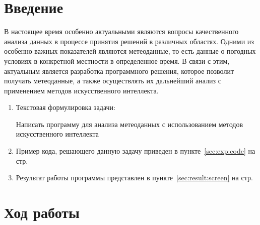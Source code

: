 \documentclass[12pt,a4paper]{scrartcl}
\begin{document}
	\section{Введение}
	\label{sec:intro}
	
	В настоящее время особенно актуальными являются вопросы качественного анализа данных в процессе принятия решений в различных областях. Одними из особенно важных показателей являются метеоданные, то есть данные о погодных условиях в конкретной местности в определенное время. В связи с этим, актуальным является разработка программного решения, которое позволит получать метеоданные, а также осуществлять их дальнейший анализ с применением методов искусственного интеллекта.
	
	\begin{enumerate}
	\item Текстовая формулировка задачи:
	
	Написать программу для анализа метеоданных с использованием методов искусственного интеллекта
	\item Пример кода, решающего данную задачу приведен в пункте~\ref{sec:exp:code} на стр.~\pageref{sec:exp:code}
	\item Результат работы программы представлен в пункте~\ref{sec:result:screen} на стр.~\pageref{sec:result:screen}
	\end{enumerate}
	
	\section{Ход работы}
	\label{sec:exp}
	
\end{document}
